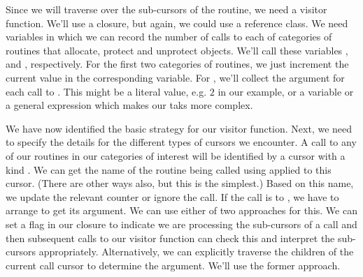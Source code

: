Since we will traverse over the sub-cursors of the routine, we need a
visitor function. We'll use a closure, but again, we could use a
reference class.  We need variables in which we can record the number
of calls to each of categories of routines that allocate, protect and
unprotect objects.  We'll call these variables ,
 and , respectively.
For the first two categories of routines, we just increment the
current value in the corresponding \R{} variable.  For
, we'll collect the argument for each call to
. This might be a literal value, e.g. $2$ in our
example, or a variable or a general expression which makes our taks
more complex.

We have now identified the basic strategy for our visitor function.
Next, we need to specify the details for the different types of
cursors we encounter. A call to any of our routines in our categories
of interest will be identified by a cursor with a kind
.  We can get the name of the routine being
called using  applied to this cursor. (There are other
ways also, but this is the simplest.)  Based on this name, we update
the relevant counter or ignore the call.  If the call is to
, we have to arrange to get its argument.  We can
use either of two approaches for this.  We can set a flag in our
closure to indicate we are processing the sub-cursors of a
 call and then subsequent calls to our visitor
function can check this and interpret the sub-cursors
appropriately. Alternatively, we can explicitly traverse the children
of the current call cursor to determine the argument.  We'll use the
former approach.

